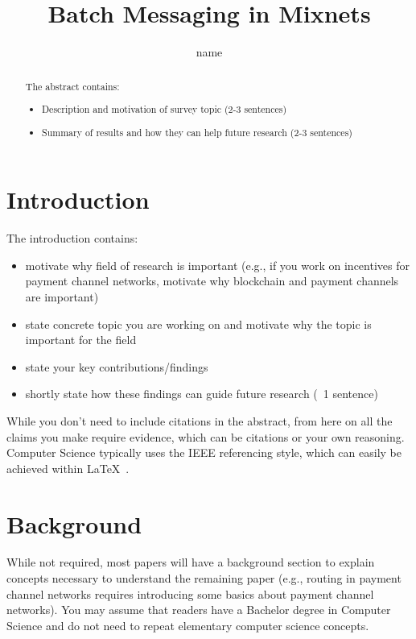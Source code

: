 \documentclass[twocolumn]{article}
\title{Batch Messaging in Mixnets}
\author{name}
\date{}
\begin{document}
\maketitle

\begin{abstract}
The abstract contains:
\begin{itemize}
\item Description and motivation of survey topic (2-3 sentences)
\item Summary of results and how they can help future research (2-3 sentences) 
\end{itemize}
\end{abstract}


\section{Introduction}

The introduction contains:
\begin{itemize}
\item motivate why field of research is important (e.g., if you work on incentives for payment channel networks,  motivate why blockchain and payment channels are important) 
\item state concrete topic you are working on and motivate why the topic is important for the field 
\item state your key contributions/findings
\item shortly state how these findings can guide future research (~1 sentence)
\end{itemize}
While you don't need to include citations in the abstract,  from here on all the claims you make require evidence,  which can be citations or your own reasoning. Computer Science typically uses the IEEE referencing style, which can easily be achieved within LaTeX~\cite{brosius1995instructions,gray2018producing}. 

\section{Background}

While not required,  most papers will have a background section to explain concepts necessary to understand the remaining paper (e.g.,  routing in payment channel networks requires introducing some basics about payment channel networks).  You may assume that readers have a Bachelor degree in Computer Science and do not need to repeat elementary computer science concepts. 
\end{document}
